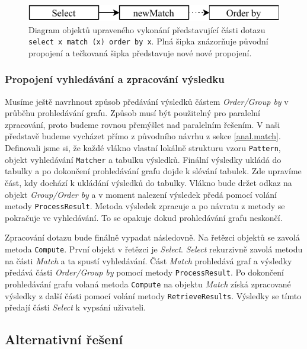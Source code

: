 \begin{figure}[!htp]
\includegraphics{../img/diaStreamedQueryObjectsCon.pdf}\centering
\caption{Diagram objektů upraveného vykonání představující části dotazu \texttt{select x match (x) order by x}. Plná šipka znázorňuje původní propojení a tečkovaná šipka představuje nové nové propojení.}
\label{figure.diaStreamedQueryObjectsCon}
\end{figure}

\subsubsection{Propojení vyhledávání a zpracování výsledku} \label{anal.improvement.con2}

Musíme ještě navrhnout způsob předávání výsledků částem \textit{Order/Group by} v průběhu prohledávání grafu.
Způsob musí být použitelný pro paralelní zpracování, proto budeme rovnou přemýšlet nad paralelním řešením.
V naši představě budeme vycházet přímo z původního návrhu z sekce \ref{anal.match}.
Definovali jsme si, že každé vlákno vlastní lokálně strukturu vzoru \texttt{Pattern}, objekt vyhledávání \texttt{Matcher} a tabulku výsledků.
Finální výsledky ukládá do tabulky a po dokončení prohledávání grafu dojde k slévání tabulek.
Zde upravíme část, kdy dochází k ukládání výsledků do tabulky.
Vlákno bude držet odkaz na objekt \textit{Group/Order by} a v moment nalezení výsledek předá pomocí volání metody \texttt{ProcessResult}.
Metoda výsledek zpracuje a po návratu z metody se pokračuje ve vyhledávání.
To se opakuje dokud prohledávání grafu neskončí.

Zpracování dotazu bude finálně vypadat následovně.
Na řetězci objektů se zavolá metoda \texttt{Compute}.
První objekt v řetězci je \textit{Select}.
\textit{Select} rekurzivně zavolá metodu na části \textit{Match} a ta spustí vyhledávání.
Část \textit{Match} prohledává graf a výsledky předává části \textit{Order/Group by} pomocí metody \texttt{ProcessResult}.
Po dokončení prohledávání grafu volaná metoda \texttt{Compute} na objektu \textit{Match} získá zpracované výsledky z další části pomocí volání metody \texttt{RetrieveResults}.
Výsledky se tímto předají části \textit{Select} k vypsání uživateli. 

\subsection{Alternativní řešení}

